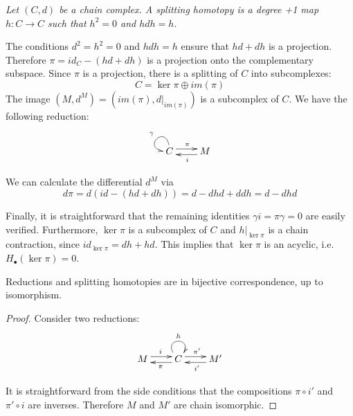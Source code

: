 \begin{defn}
{\em
Let $(C,d)$ be a chain complex.  A {\em splitting homotopy} is a degree +1 map $h:C\to C$ such that $h^2=0$ and $h dh = h$.
}
\end{defn}

The conditions $d^2=h^2=0$ and $hdh = h$ ensure that $hd+dh$ is a projection.  Therefore $\pi=id_C-(hd+dh)$ is a projection onto the complementary subspace.  Since $\pi$ is a projection, there is a splitting of $C$ into subcomplexes:
\[
C=\ker\pi\oplus im(\pi)
\] The image $(M,d^M)=(im(\pi),d|_{im(\pi)})$ is a subcomplex of $C$.  We have the following reduction:
\begin{align}\label{reduction:homotopy}
\xymatrixrowsep{0.03in}
\xymatrixcolsep{0.3in}
\xymatrix{
C  \ar@(u,l)_{\gamma}  \ar[r]<3pt>^{ \pi } & \ar[l]<3pt>^{i } M
}
\end{align}

We can calculate the differential $d^M$ via $$d\pi = d(id-(hd+dh)) = d-dhd + ddh = d-dhd$$

Finally, it is straightforward that the remaining identities $\gamma i=\pi\gamma = 0$ are easily verified. Furthermore, $\ker\pi$ is a subcomplex of $C$ and $h|_{\ker\pi}$ is a chain contraction, since $id_{\ker\pi} = dh+hd$.  This implies that $\ker\pi$ is an acyclic, i.e. $H_\bullet(\ker\pi) = 0$.



\begin{prop}\label{prop:cont:homiso}
Reductions and splitting homotopies are in bijective correspondence, up to isomorphism.
\end{prop}
\begin{proof}
Consider two reductions:
\[
\xymatrixrowsep{0.03in}
\xymatrixcolsep{0.3in}
\xymatrix{
M  \ar[r]<3pt>^{i} & \ar[l]<3pt>^{\pi} C \ar@(ul,ur)^{h} \ar[r]<3pt>^{\pi'}  & M'  \ar[l]<3pt>^{i'}
}
\] 

It is straightforward from the side conditions that the compositions $\pi\circ i'$ and $\pi'\circ i$ are inverses.  Therefore $M$ and $M'$ are chain isomorphic.
\end{proof}


